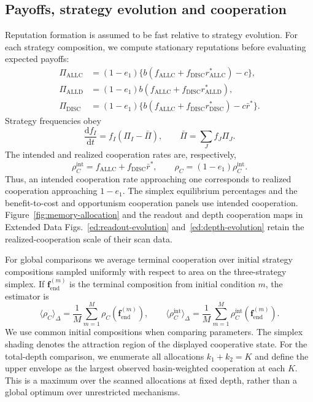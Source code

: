 \documentclass[fleqn,10pt]{article}
\begin{document}
\subsection*{Payoffs, strategy evolution and cooperation}

Reputation formation is assumed to be fast relative to strategy evolution. For each strategy composition, we compute stationary reputations before evaluating expected payoffs:
\begin{equation}
\begin{aligned}
\Pi_{\mathrm{ALLC}}&=(1-e_1)\{b(f_{\mathrm{ALLC}}+f_{\mathrm{DISC}}r_{\mathrm{ALLC}}^*)-c\},\\
\Pi_{\mathrm{ALLD}}&=(1-e_1)b(f_{\mathrm{ALLC}}+f_{\mathrm{DISC}}r_{\mathrm{ALLD}}^*),\\
\Pi_{\mathrm{DISC}}&=(1-e_1)\{b(f_{\mathrm{ALLC}}+f_{\mathrm{DISC}}r_{\mathrm{DISC}}^*)-c\bar r^*\}.
\end{aligned}
\label{eq:methods-payoffs}
\end{equation}
Strategy frequencies obey
\begin{equation}
\frac{\mathrm df_I}{\mathrm dt}=f_I(\Pi_I-\bar\Pi),
\qquad \bar\Pi=\sum_J f_J\Pi_J.
\label{eq:methods-replicator}
\end{equation}
The intended and realized cooperation rates are, respectively,
\begin{equation}
\rho_C^{\mathrm{int}}=f_{\mathrm{ALLC}}+f_{\mathrm{DISC}}\bar r^*,
\qquad \rho_C=(1-e_1)\rho_C^{\mathrm{int}}.
\label{eq:methods-cooperation}
\end{equation}
Thus, an intended cooperation rate approaching one corresponds to realized cooperation approaching $1-e_1$. The simplex equilibrium percentages and the benefit-to-cost and opportunism cooperation panels use intended cooperation. Figure~\ref{fig:memory-allocation} and the readout and depth cooperation maps in Extended Data Figs.~\ref{ed:readout-evolution} and~\ref{ed:depth-evolution} retain the realized-cooperation scale of their scan data.

For global comparisons we average terminal cooperation over initial strategy compositions sampled uniformly with respect to area on the three-strategy simplex. If $\boldsymbol f_{\mathrm{end}}^{(m)}$ is the terminal composition from initial condition $m$, the estimator is
\begin{equation}
\langle\rho_C\rangle_\Delta=
\frac{1}{M}\sum_{m=1}^{M}\rho_C(\boldsymbol f_{\mathrm{end}}^{(m)}),
\qquad
\langle\rho_C^{\mathrm{int}}\rangle_\Delta=
\frac{1}{M}\sum_{m=1}^{M}\rho_C^{\mathrm{int}}(\boldsymbol f_{\mathrm{end}}^{(m)}).
\label{eq:methods-basin-average}
\end{equation}
We use common initial compositions when comparing parameters. The simplex shading denotes the attraction region of the displayed cooperative state. For the total-depth comparison, we enumerate all allocations $k_1+k_2=K$ and define the upper envelope as the largest observed basin-weighted cooperation at each $K$. This is a maximum over the scanned allocations at fixed depth, rather than a global optimum over unrestricted mechanisms.
\end{document}
